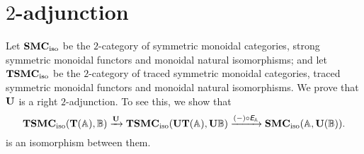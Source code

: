 
\section{$2$-adjunction}
\label{2-adjunction}

Let $\mathbf{SMC}_{\mathrm{iso}}$ be the $2$-category of symmetric monoidal categories,
strong symmetric monoidal functors and monoidal natural isomorphisms;
and let $\mathbf{TSMC}_{\mathrm{iso}}$ be the $2$-category of traced symmetric
monoidal categories, traced symmetric monoidal functors and monoidal
natural isomorphisms. We prove that $\mathbf{U}$ is a right $2$-adjunction.
To see this, we show that
\begin{equation*}
  \mathbf{TSMC}_{\mathrm{iso}}(\mathbf T(\mathbb{A}),\mathbb{B}) \xrightarrow{\mathbf{U}}
  \mathbf{TSMC}_{\mathrm{iso}}(\mathbf{U}\mathbf T(\mathbb{A}),\mathbf{U}\mathbb{B}) \xrightarrow{(-) \circ \textit{\textsf{E}}_{\mathbb{A}}}
  \mathbf{SMC}_{\mathrm{iso}}(\mathbb{A},\mathbf{U}(\mathbb{\mathbb{B}})).
\end{equation*}
is an isomorphism between them.

